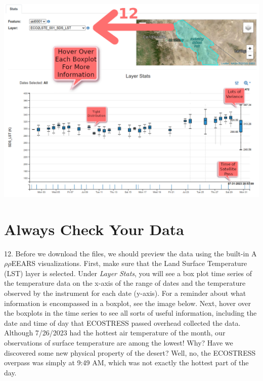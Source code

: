 \documentclass[oneside,a4paper,11pt,explicit]{book}
\begin{document}

\centerline{\includegraphics[width=\textwidth]{ExploreLST.png}}

\section{Always Check Your Data} 

12. Before we download the files, we should preview the data using the built-in A$\rho\rho$EEARS visualizations. First, make sure that the Land Surface Temperature (LST) layer is selected. Under \textit{Layer Stats}, you will see a box plot time series of the temperature data on the x-axis of the range of dates and the temperature observed by the instrument for each date (y-axis). For a reminder about what information is encompassed in a boxplot, see the image below. Next, hover over the boxplots in the time series to see all sorts of useful information, including the date and time of day that ECOSTRESS passed overhead collected the data. Although 7/26/2023 had the hottest air temperature of the month, our observations of surface temperature are among the lowest! Why? Have we discovered some new physical property of the desert? Well, no, the ECOSTRESS overpass was simply at 9:49 AM, which was not exactly the hottest part of the day.

\end{document}
